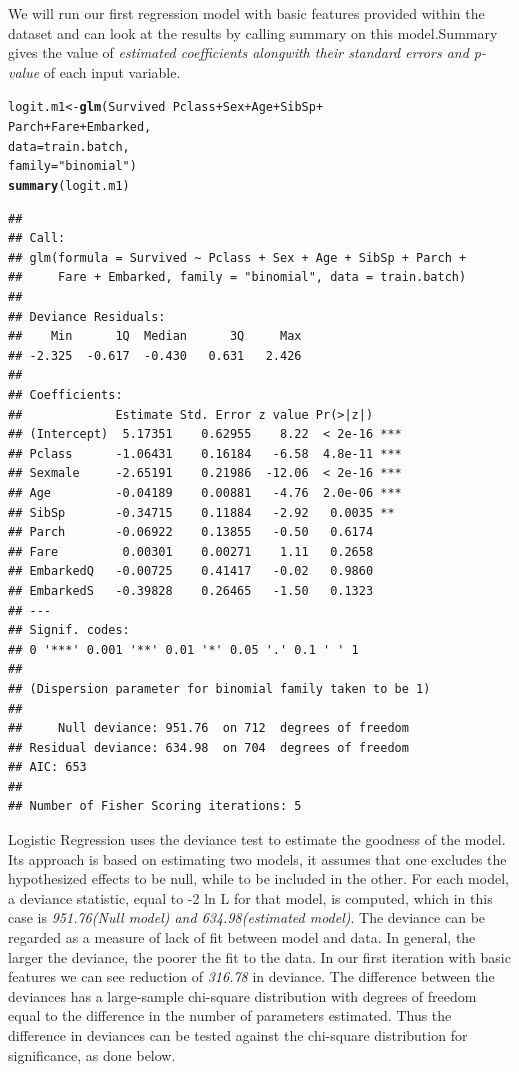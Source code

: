 \documentclass[a4paper,10pt]{report}\usepackage[]{graphicx}\usepackage[]{color}
\makeatletter
\newcommand{\hlstr}[1]{\textcolor[rgb]{0.192,0.494,0.8}{#1}}%
\newcommand{\hlopt}[1]{\textcolor[rgb]{0,0,0}{#1}}%
\newcommand{\hlstd}[1]{\textcolor[rgb]{0.345,0.345,0.345}{#1}}%
\newcommand{\hlkwb}[1]{\textcolor[rgb]{0.69,0.353,0.396}{#1}}%
\newcommand{\hlkwc}[1]{\textcolor[rgb]{0.333,0.667,0.333}{#1}}%
\newcommand{\hlkwd}[1]{\textcolor[rgb]{0.737,0.353,0.396}{\textbf{#1}}}%
\newenvironment{kframe}{%
 \def\at@end@of@kframe{}%
 \ifinner\ifhmode%
  \def\at@end@of@kframe{\end{minipage}}%
  \begin{minipage}{\columnwidth}%
 \fi\fi%
 \def\FrameCommand##1{\hskip\@totalleftmargin \hskip-\fboxsep
 \colorbox{shadecolor}{##1}\hskip-\fboxsep
     \hskip-\linewidth \hskip-\@totalleftmargin \hskip\columnwidth}%
 \MakeFramed {\advance\hsize-\width
   \@totalleftmargin\z@ \linewidth\hsize
   \@setminipage}}%
 {\par\unskip\endMakeFramed%
 \at@end@of@kframe}
\newenvironment{knitrout}{}{} %
\makeatother
\begin{document}
We will run our first regression model with basic features provided within the dataset and can look at the results by calling summary on this model.Summary gives the value of \emph{estimated coefficients alongwith their standard errors and p-value} of each input variable. 

\begin{knitrout}
\color{fgcolor}\begin{kframe}
\begin{alltt}
\hlstd{logit.m1} \hlkwb{<-} \hlkwd{glm}\hlstd{(Survived} \hlopt{~} \hlstd{Pclass} \hlopt{+} \hlstd{Sex} \hlopt{+} \hlstd{Age} \hlopt{+} \hlstd{SibSp} \hlopt{+}
                  \hlstd{Parch} \hlopt{+} \hlstd{Fare} \hlopt{+} \hlstd{Embarked,}
                \hlkwc{data} \hlstd{= train.batch,}
                \hlkwc{family}\hlstd{=}\hlstr{"binomial"}\hlstd{)}
\hlkwd{summary}\hlstd{(logit.m1)}
\end{alltt}
\begin{verbatim}
## 
## Call:
## glm(formula = Survived ~ Pclass + Sex + Age + SibSp + Parch + 
##     Fare + Embarked, family = "binomial", data = train.batch)
## 
## Deviance Residuals: 
##    Min      1Q  Median      3Q     Max  
## -2.325  -0.617  -0.430   0.631   2.426  
## 
## Coefficients:
##             Estimate Std. Error z value Pr(>|z|)    
## (Intercept)  5.17351    0.62955    8.22  < 2e-16 ***
## Pclass      -1.06431    0.16184   -6.58  4.8e-11 ***
## Sexmale     -2.65191    0.21986  -12.06  < 2e-16 ***
## Age         -0.04189    0.00881   -4.76  2.0e-06 ***
## SibSp       -0.34715    0.11884   -2.92   0.0035 ** 
## Parch       -0.06922    0.13855   -0.50   0.6174    
## Fare         0.00301    0.00271    1.11   0.2658    
## EmbarkedQ   -0.00725    0.41417   -0.02   0.9860    
## EmbarkedS   -0.39828    0.26465   -1.50   0.1323    
## ---
## Signif. codes:  
## 0 '***' 0.001 '**' 0.01 '*' 0.05 '.' 0.1 ' ' 1
## 
## (Dispersion parameter for binomial family taken to be 1)
## 
##     Null deviance: 951.76  on 712  degrees of freedom
## Residual deviance: 634.98  on 704  degrees of freedom
## AIC: 653
## 
## Number of Fisher Scoring iterations: 5
\end{verbatim}
\end{kframe}
\end{knitrout}

Logistic Regression uses the deviance test to estimate the goodness of the model. Its approach is based on estimating two models, it assumes that one excludes the hypothesized effects to be null, while to be included in 
the other. For each model, a deviance statistic, equal to -2 ln L for that model, is computed, which in this case is
\emph{951.76(Null model) and 634.98(estimated model)}. The deviance can be regarded as a measure of lack of fit between 
model and data. In general, the larger the deviance, the poorer the fit to the data. In our first iteration with basic
features we can see reduction of \emph{316.78} in deviance. The difference between the deviances has a large-sample chi-square distribution with degrees of freedom equal to the difference in the number of parameters estimated. Thus the difference in deviances can be tested against the chi-square distribution for significance, as done below.
\end{document}
